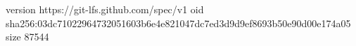 version https://git-lfs.github.com/spec/v1
oid sha256:03dc71022964732051603b6e4e821047dc7ed3d9d9ef8693b50e90d00e174a05
size 87544

